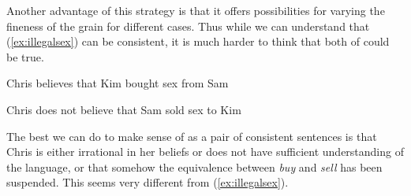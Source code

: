 Another advantage of this strategy is that it offers possibilities for
varying the fineness of the grain for different cases.  Thus while we
can understand that (\ref{ex:illegalsex}) can be consistent, it is
much harder to think that both of  could be true.
\begin{ex} 
\begin{subex} 
 
\item Chris believes that Kim bought sex from Sam 
 
\item Chris does not believe that Sam sold sex to Kim 
 
\end{subex} 
   
\end{ex} 
The best we can do to make sense of \preveg{} as a pair of consistent
sentences is that Chris is either irrational in her beliefs or does
not have sufficient understanding of the language, or that somehow the
equivalence between \textit{buy} and \textit{sell} has been suspended.
This seems very different from (\ref{ex:illegalsex}).

